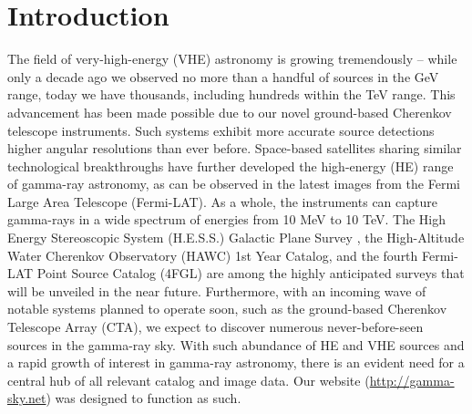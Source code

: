 \section{Introduction}

The field of very-high-energy (VHE) astronomy is growing tremendously – while only a decade ago we observed no more than a handful of sources in the GeV range, today we have thousands, including hundreds within the TeV range. This advancement has been made possible due to our novel ground-based Cherenkov telescope instruments. Such systems exhibit more accurate source detections higher angular resolutions than ever before. Space-based satellites sharing similar technological breakthroughs have further developed the high-energy (HE) range of gamma-ray astronomy, as can be observed in the latest images from the Fermi Large Area Telescope (Fermi-LAT). As a whole, the instruments can capture gamma-rays in a wide spectrum of energies from 10 MeV to 10 TeV. The High Energy Stereoscopic System (H.E.S.S.) Galactic Plane Survey \cite{hgps}, the High-Altitude Water Cherenkov Observatory (HAWC) 1st Year Catalog, and the fourth Fermi-LAT Point Source Catalog (4FGL) are among the highly anticipated surveys that will be unveiled in the near future. Furthermore, with an incoming wave of notable systems planned to operate soon, such as the ground-based Cherenkov Telescope Array (CTA), we expect to discover numerous never-before-seen sources in the gamma-ray sky. With such abundance of HE and VHE sources and a rapid growth of interest in gamma-ray astronomy, there is an evident need for a central hub of all relevant catalog and image data. Our website (\url{http://gamma-sky.net}) was designed to function as such.

%
